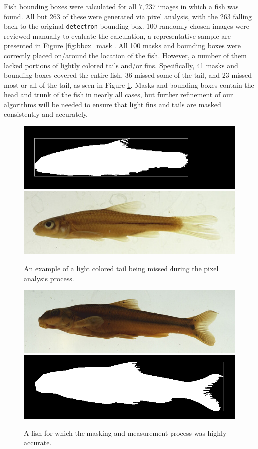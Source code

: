\documentclass[conference]{IEEEtran}
\begin{document}
Fish bounding boxes were calculated for all \(7,237\) images in which a fish was found. All but 263 of these were generated via pixel analysis, with
the 263 falling back to the original \verb|detectron| bounding box.
100 randomly-chosen images were reviewed manually to evaluate the
calculation, a representative sample are presented in
Figure \ref{fig:bbox_mask}.
All 100 masks and bounding boxes were correctly placed
on/around the location of the fish. However, a number of them lacked portions of lightly colored tails and/or fins.
Specifically, 41 masks and bounding boxes covered the entire fish,
36 missed some of the tail, and 23 missed most or all of the tail, as
seen in Figure \ref{fig:missedTail}.
Masks and bounding boxes contain the head and trunk of the fish in nearly all cases, but further refinement of our algorithms will be needed
to ensure that light fins and tails are masked consistently and accurately.
\begin{figure}[t]
  \centering
  \includegraphics[width=0.49\linewidth]{images/61631}
  \includegraphics[width=0.49\linewidth]{images/61631_mask}
  \caption{An example of a light colored tail being missed during the pixel analysis process.}
  \label{fig:missedTail}
\end{figure}

\begin{figure}[b]
  \centering
  \includegraphics[width=0.49\linewidth]{images/54172}
  \includegraphics[width=0.49\linewidth]{images/54172_mask}
  \caption{A fish for which the masking and measurement process was highly accurate.}
  \label{fig:scale_len}
\end{figure}
\end{document}
